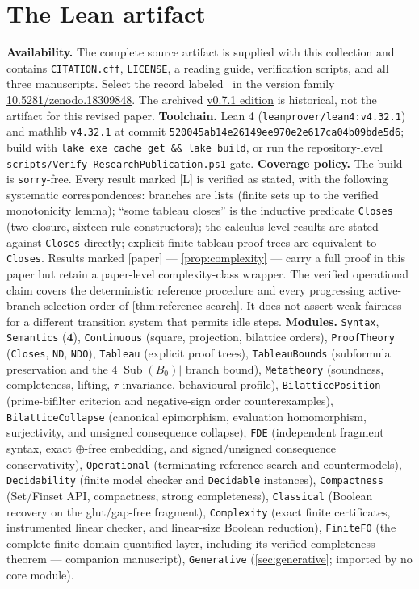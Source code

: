 \documentclass[11pt,a4paper]{article}
\theoremstyle{definition}
\newcommand{\FOUR}{\mathbf{4}}
\newcommand{\hmz}{\oplus}                       %
\newcommand{\lean}[1]{\texttt{#1}}
\begin{document}
\section{The Lean artifact}\label{app:lean}
\textbf{Availability.} The complete source artifact is supplied with this
collection and contains \texttt{CITATION.cff}, \texttt{LICENSE}, a reading
guide, verification scripts, and all three manuscripts. Select the record
labeled \PublicationVersion\ in the version family
\href{https://doi.org/10.5281/zenodo.18309848}{10.5281/zenodo.18309848}.
The archived \href{https://doi.org/10.5281/zenodo.21964600}{v0.7.1 edition}
is historical, not the artifact for this revised paper.
\textbf{Toolchain.} Lean 4
(\texttt{leanprover/lean4:v4.32.1}) and mathlib \texttt{v4.32.1} at commit
\texttt{520045ab14e26149ee970e2e617ca04b09bde5d6}; build with
\texttt{lake exe cache get \&\& lake build}, or run the repository-level
\texttt{scripts/Verify-ResearchPublication.ps1} gate.
\textbf{Coverage policy.} The build is \texttt{sorry}-free. Every result
marked [L] is verified as stated, with the following systematic
correspondences: branches are lists (finite sets up to the verified
monotonicity lemma); ``some tableau closes'' is the inductive predicate
\lean{Closes} (two closure, sixteen rule constructors); the calculus-level
results are stated against \lean{Closes} directly; explicit finite tableau
proof trees are equivalent to \lean{Closes}. Results marked [paper] ---
\cref{prop:complexity} --- carry a full proof in this paper but retain a
paper-level complexity-class wrapper. The verified
operational claim covers the deterministic reference procedure and every
progressing active-branch selection order of \cref{thm:reference-search}.
It does not assert weak fairness for a different transition system that
permits idle steps. \textbf{Modules.} \texttt{Syntax}, \texttt{Semantics}
($\FOUR$), \texttt{Continuous} (square, projection, bilattice orders),
\texttt{ProofTheory} (\lean{Closes}, \lean{ND}, \lean{NDO}), \texttt{Tableau}
(explicit proof trees), \texttt{TableauBounds} (subformula preservation and the
$4|\operatorname{Sub}(B_0)|$ branch bound), \texttt{Metatheory}
(soundness, completeness, lifting, $\tau$-invariance, behavioural profile),
\texttt{BilatticePosition} (prime-bifilter criterion and negative-sign
order counterexamples), \texttt{BilatticeCollapse} (canonical epimorphism,
evaluation homomorphism, surjectivity, and unsigned consequence collapse),
\texttt{FDE} (independent fragment syntax, exact $\hmz$-free embedding, and
signed/unsigned consequence conservativity),
\texttt{Operational} (terminating reference search and countermodels),
\texttt{Decidability} (finite model checker and \lean{Decidable} instances),
\texttt{Compactness} (Set/Finset API, compactness, strong completeness),
\texttt{Classical} (Boolean recovery on the glut/gap-free fragment),
\texttt{Complexity} (exact finite certificates, instrumented linear checker,
and linear-size Boolean reduction),
\texttt{FiniteFO} (the complete finite-domain quantified layer, including its
verified completeness theorem — companion manuscript),
\texttt{Generative} (\cref{sec:generative}; imported by no core module).

{\footnotesize


}
\end{document}
